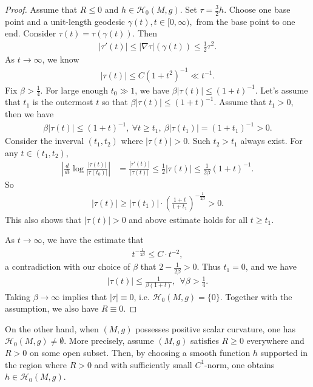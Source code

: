 \documentclass[11pt, letterpaper]{amsart}
\theoremstyle{definition}
\theoremstyle{remark}
\begin{document}
\begin{proof}
	Assume that $R \leq 0$ and $h \in \mathcal{H}_0(M,g)$. Set $\tau = \frac{3}{2} h$. Choose one base point and a unit-length geodesic $\gamma (t), t \in [0, \infty),$ from the base point to one end. Consider $\tau (t) = \tau (\gamma (t) )$. Then
	\begin{align*}
		|\tau '(t)| \leq |\nabla \tau | (\gamma (t) ) \leq \frac{1}{2} \tau ^2.
	\end{align*} 
	 As $t\to \infty$, we know
	\begin{align*}
		|\tau (t)| \leq C (1+ t ^2)^{-1} \ll  t ^{-1}.
	\end{align*} 
	 Fix $\beta > \frac{1}{4}$. For large enough $t_0 \gg 1$, we have $\beta |\tau (t)| \leq (1+t) ^{-1}$. Let's assume that $t_1$ is the outermost $t$ so that $\beta |\tau (t)| \leq (1+t) ^{-1}$. Assume that $t_1 > 0$, then we have
	 \begin{align*}
	 	\beta |\tau (t)| \leq (1+t)^{-1},\ \forall t \geq t_1,\ \beta |\tau (t_1) | = (1+ t_1) ^{-1}>0.
	 \end{align*} 
	 Consider the inverval $(t_1, t_2)$ where $|\tau (t)| >0$. Such $t_2>t_1$ always exist. For any $t \in (t_1, t_2)$, 
	 \begin{align*}
		 \left|\frac{d}{d t} \log \frac{|\tau (t)|}{|\tau (t_0)|} \right| &= \frac{|\tau '(t)|}{|\tau (t)|} \leq \frac{1}{2} |\tau (t)| \leq \frac{1}{2 \beta } (1+t)^{-1}.
	 \end{align*} 
	 So
	 \begin{align*}
	 	|\tau (t)| \geq |\tau (t_1)| \cdot \left( \frac{1+t}{1+ t_1} \right) ^{- \frac{1}{2 \beta }} >0.
	 \end{align*} 
	 This also shows that $|\tau (t)| >0 $ and above estimate holds for all $t \geq t_1$. 

	 As $t\to \infty$, we have the estimate that
\begin{align*}
	 t ^{-\frac{1}{2 \beta }} \leq C\cdot t ^{-2},
\end{align*}
a contradiction with our choice of $\beta $ that $2- \frac{1}{2 \beta }>0$. Thus $t_1 = 0$, and we have 
\begin{align*}
	|\tau (t)| \leq \frac{1}{\beta (1+t)},\ \  \forall \beta > \frac{1}{4}.
\end{align*} 
Taking $\beta \to \infty$ implies that $|\tau | \equiv 0$, i.e. $ \mathcal{H}_0(M,g) = \{0\} $. Together with the assumption, we also have $R \equiv 0$.
\end{proof}

On the other hand, when $(M,g)$ possesses positive scalar curvature, one has $\mathcal{H}_{0}(M, g) \neq \emptyset$. More precisely, assume $(M,g)$ satisfies $R \geq 0$ everywhere and $R>0$ on some open subset. Then, by choosing a smooth function $h$ supported in the region where $R>0$ and with sufficiently small $C^1$-norm, one obtains $h \in \mathcal{H}_{0}(M,g)$.
\end{document}
